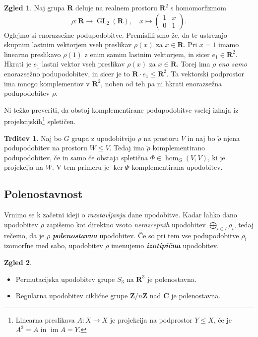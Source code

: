 \documentclass[11pt]{book}
\def\ZZ{\mathbf{Z}}
\def\RR{\mathbf{R}}
\def\CC{\mathbf{C}}
\DeclareMathOperator\image{im}
\DeclareMathOperator\GL{GL}
\def\definicija{\color{rdeca}\bf\em}
\theoremstyle{definition}
\theoremstyle{zgled}
\newtheorem*{zgled}{Zgled}
\theoremstyle{odprtproblem}
\theoremstyle{domacanaloga}
\theoremstyle{izrek}
\newtheorem*{trditev}{Trditev}
\begin{document}
\begin{zgled}
Naj grupa $\RR$ deluje na realnem prostoru $\RR^2$ s homomorfizmom
    \[
        \rho \colon \RR \to {\textstyle \GL_2(\RR)}, \quad
        x \mapsto 
        \begin{pmatrix} 
        1 & x \\ 0 & 1 
    \end{pmatrix}.
\]
Oglejmo si enorazsežne podupodobitve. Premislili smo že, da te ustrezajo skupnim lastnim vektorjem vseh preslikav $\rho(x)$ za $x \in \RR$. Pri $x = 1$ imamo linearno preslikavo $\rho(1)$ z enim samim lastnim vektorjem, in sicer $e_1 \in \RR^2$. Hkrati je $e_1$ lastni vektor vseh preslikav $\rho(x)$ za $x \in \RR$. Torej ima $\rho$ \emph{eno samo} enorazsežno podupodobitev, in sicer je to $\RR \cdot e_1 \leq \RR^2$. Ta vektorski podprostor ima mnogo komplementov v $\RR^2$, noben od teh pa ni hkrati enorazsežna podupodobitev $\rho$.
\end{zgled}

Ni težko preveriti, da obstoj komplementirane podupodobitve vselej izhaja iz projekcijskih\footnote{Linearna preslikava $A \colon X \to X$ je projekcija na podprostor $Y \leq X$, če je $A^2 = A$ in $\image A = Y$.} spletičen.

\begin{trditev}
Naj bo $G$ grupa z upodobitvijo $\rho$ na prostoru $V$ in naj bo $\tilde \rho$ njena podupodobitev na prostoru $W \leq V$. Tedaj ima $\tilde \rho$ komplementirano podupodobitev, če in samo če obstaja spletična $\Phi \in \hom_G(V,V)$, ki je projekcija na $W$. V tem primeru je $\ker \Phi$ komplementirana upodobitev.
\end{trditev}

\subsection{Polenostavnost}

Vrnimo se k začetni ideji o \emph{razstavljanju} dane upodobitve. Kadar lahko dano upodobitev $\rho$ zapišemo kot direktno vsoto \emph{nerazcepnih} upodobitev $\bigoplus_{i \in I} \rho_i$, tedaj rečemo, da je $\rho$ {\definicija polenostavna} upodobitev. Če so pri tem vse podupodobitve $\rho_i$ izomorfne med sabo, upodobitev $\rho$ imenujemo {\definicija izotipična} upodobitev.

\begin{zgled} \leavevmode
    \begin{itemize}
        \item Permutacijska upodobitev grupe $S_3$ na $\RR^3$ je polenostavna.
        \item Regularna upodobitev ciklične grupe $\ZZ/n\ZZ$ nad $\CC$ je polenostavna.
    \end{itemize}
\end{zgled}
\end{document}
